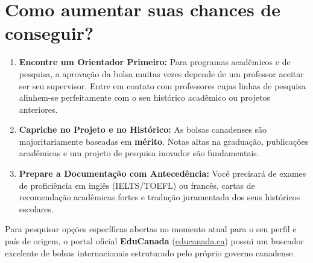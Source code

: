 \documentclass[12pt,a4paper]{article}
\begin{document}
\section{Como aumentar suas chances de conseguir?}

\begin{enumerate}
    \item \textbf{Encontre um Orientador Primeiro:} Para programas acadêmicos e de pesquisa, a aprovação da bolsa muitas vezes depende de um professor aceitar ser seu supervisor. Entre em contato com professores cujas linhas de pesquisa alinhem-se perfeitamente com o seu histórico acadêmico ou projetos anteriores.
    \item \textbf{Capriche no Projeto e no Histórico:} As bolsas canadenses são majoritariamente baseadas em \textbf{mérito}. Notas altas na graduação, publicações acadêmicas e um projeto de pesquisa inovador são fundamentais.
    \item \textbf{Prepare a Documentação com Antecedência:} Você precisará de exames de proficiência em inglês (IELTS/TOEFL) ou francês, cartas de recomendação acadêmicas fortes e tradução juramentada dos seus históricos escolares.
\end{enumerate}

Para pesquisar opções específicas abertas no momento atual para o seu perfil e país de origem, o portal oficial \textbf{EduCanada} (\href{https://www.educanada.ca}{educanada.ca}) possui um buscador excelente de bolsas internacionais estruturado pelo próprio governo canadense.
\end{document}
